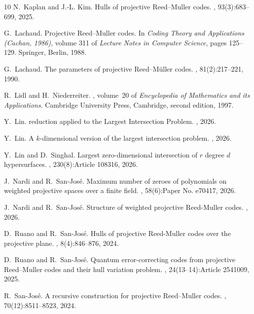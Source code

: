 \documentclass[11pt]{amsart}
\theoremstyle{definition}
\numberwithin{equation}{section}
\begin{document}
\begin{thebibliography}{10}
N.~Kaplan and J.-L. Kim.
\newblock Hulls of projective {Reed--Muller} codes.
, 93(3):683--699, 2025.

G.~Lachaud.
\newblock Projective {Reed--Muller} codes.
\newblock In {\em Coding Theory and Applications (Cachan, 1986)}, volume 311 of {\em Lecture Notes in Computer Science}, pages 125--129. Springer, Berlin, 1988.

G.~Lachaud.
\newblock The parameters of projective {Reed--M{\"u}ller} codes.
, 81(2):217--221, 1990.

R.~Lidl and H.~Niederreiter.
, volume~20 of {\em Encyclopedia of Mathematics and its Applications}.
\newblock Cambridge University Press, Cambridge, second edition, 1997.

Y.~Lin.
 reduction applied to the {Largest Intersection Problem}.
, 2026.

Y.~Lin.
\newblock A {$k$}-dimensional version of the largest intersection problem.
, 2026.

Y.~Lin and D.~Singhal.
\newblock Largest zero-dimensional intersection of {$r$} degree {$d$} hypersurfaces.
, 230(8):Article 108316, 2026.

J.~Nardi and R.~San-Jos\'e.
\newblock Maximum number of zeroes of polynomials on weighted projective spaces over a finite field.
, 58(6):Paper No. e70417, 2026.

J.~Nardi and R.~San-José.
\newblock Structure of weighted projective {R}eed-{M}uller codes.
, 2026.

D.~Ruano and R.~San-Jos\'e.
\newblock Hulls of projective {R}eed-{M}uller codes over the projective plane.
, 8(4):846--876, 2024.

D.~Ruano and R.~San-Jos\'e.
\newblock Quantum error-correcting codes from projective {R}eed–{M}uller codes and their hull variation problem.
, 24(13--14):Article 2541009, 2025.

R.~San-Jos{\'e}.
\newblock A recursive construction for projective {Reed--Muller} codes.
, 70(12):8511--8523, 2024.


\end{thebibliography}
\end{document}
